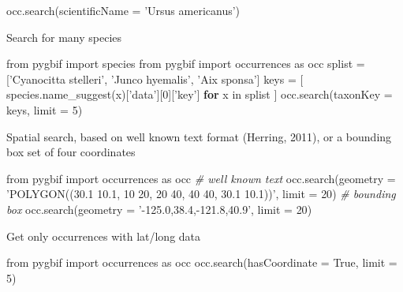 \documentclass[author-year, review, 11pt]{components/elsarticle} %
\newenvironment{Shaded}{\begin{snugshade}}{\end{snugshade}}
\newcommand{\KeywordTok}[1]{\textcolor[rgb]{0.13,0.29,0.53}{\textbf{{#1}}}}
\newcommand{\DecValTok}[1]{\textcolor[rgb]{0.00,0.00,0.81}{{#1}}}
\newcommand{\CharTok}[1]{\textcolor[rgb]{0.31,0.60,0.02}{{#1}}}
\newcommand{\StringTok}[1]{\textcolor[rgb]{0.31,0.60,0.02}{{#1}}}
\newcommand{\CommentTok}[1]{\textcolor[rgb]{0.56,0.35,0.01}{\textit{{#1}}}}
\newcommand{\OtherTok}[1]{\textcolor[rgb]{0.56,0.35,0.01}{{#1}}}
\newcommand{\NormalTok}[1]{{#1}}
\begin{document}
\begin{Shaded}
\begin{Highlighting}[]
\NormalTok{occ.search(scientificName = }\StringTok{'Ursus americanus'}\NormalTok{)}
\end{Highlighting}
\end{Shaded}

Search for many species

\begin{Shaded}
\begin{Highlighting}[]
\CharTok{from} \NormalTok{pygbif }\CharTok{import} \NormalTok{species}
\CharTok{from} \NormalTok{pygbif }\CharTok{import} \NormalTok{occurrences }\CharTok{as} \NormalTok{occ}
\NormalTok{splist = [}\StringTok{'Cyanocitta stelleri'}\NormalTok{, }\StringTok{'Junco hyemalis'}\NormalTok{, }\StringTok{'Aix sponsa'}\NormalTok{]}
\NormalTok{keys = [ species.name_suggest(x)[}\StringTok{'data'}\NormalTok{][}\DecValTok{0}\NormalTok{][}\StringTok{'key'}\NormalTok{] }\KeywordTok{for} \NormalTok{x in splist ]}
\NormalTok{occ.search(taxonKey = keys, limit = }\DecValTok{5}\NormalTok{)}
\end{Highlighting}
\end{Shaded}

Spatial search, based on well known text format (Herring, 2011), or a
bounding box set of four coordinates

\begin{Shaded}
\begin{Highlighting}[]
\CharTok{from} \NormalTok{pygbif }\CharTok{import} \NormalTok{occurrences }\CharTok{as} \NormalTok{occ}
\CommentTok{# well known text}
\NormalTok{occ.search(geometry = }\StringTok{'POLYGON((30.1 10.1, 10 20, 20 40, 40 40, 30.1 10.1))'}\NormalTok{, limit = }\DecValTok{20}\NormalTok{)}
\CommentTok{# bounding box}
\NormalTok{occ.search(geometry = }\StringTok{'-125.0,38.4,-121.8,40.9'}\NormalTok{, limit = }\DecValTok{20}\NormalTok{)}
\end{Highlighting}
\end{Shaded}

Get only occurrences with lat/long data

\begin{Shaded}
\begin{Highlighting}[]
\CharTok{from} \NormalTok{pygbif }\CharTok{import} \NormalTok{occurrences }\CharTok{as} \NormalTok{occ}
\NormalTok{occ.search(hasCoordinate = }\OtherTok{True}\NormalTok{, limit = }\DecValTok{5}\NormalTok{)}
\end{Highlighting}
\end{Shaded}
\end{document}
